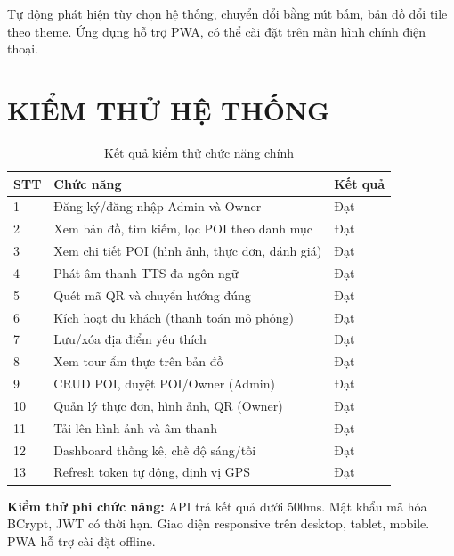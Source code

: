 \documentclass[a4paper,13pt]{report}
\begin{document}
Tự động phát hiện tùy chọn hệ thống, chuyển đổi bằng nút bấm, bản đồ đổi tile theo theme. Ứng dụng hỗ trợ PWA, có thể cài đặt trên màn hình chính điện thoại.

\chapter{KIỂM THỬ HỆ THỐNG}

\begin{table}[H]
\centering
\caption{Kết quả kiểm thử chức năng chính}
\begin{tabularx}{\textwidth}{|l|X|l|}
\hline
\textbf{STT} & \textbf{Chức năng} & \textbf{Kết quả} \\
\hline
1 & Đăng ký/đăng nhập Admin và Owner & Đạt \\
\hline
2 & Xem bản đồ, tìm kiếm, lọc POI theo danh mục & Đạt \\
\hline
3 & Xem chi tiết POI (hình ảnh, thực đơn, đánh giá) & Đạt \\
\hline
4 & Phát âm thanh TTS đa ngôn ngữ & Đạt \\
\hline
5 & Quét mã QR và chuyển hướng đúng & Đạt \\
\hline
6 & Kích hoạt du khách (thanh toán mô phỏng) & Đạt \\
\hline
7 & Lưu/xóa địa điểm yêu thích & Đạt \\
\hline
8 & Xem tour ẩm thực trên bản đồ & Đạt \\
\hline
9 & CRUD POI, duyệt POI/Owner (Admin) & Đạt \\
\hline
10 & Quản lý thực đơn, hình ảnh, QR (Owner) & Đạt \\
\hline
11 & Tải lên hình ảnh và âm thanh & Đạt \\
\hline
12 & Dashboard thống kê, chế độ sáng/tối & Đạt \\
\hline
13 & Refresh token tự động, định vị GPS & Đạt \\
\hline
\end{tabularx}
\end{table}

\textbf{Kiểm thử phi chức năng:} API trả kết quả dưới 500ms. Mật khẩu mã hóa BCrypt, JWT có thời hạn. Giao diện responsive trên desktop, tablet, mobile. PWA hỗ trợ cài đặt offline.

\end{document}
